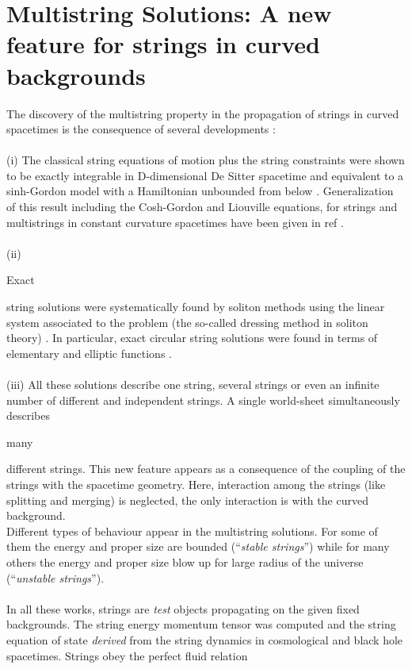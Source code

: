 \documentclass[12pt,a4paper]{article}
\begin{document}
\section{Multistring Solutions: A new feature for strings in curved 
backgrounds} 
The discovery of the multistring property \cite{cvms} \cite{vms} in the 
propagation of strings
in curved spacetimes is the consequence of several developments : \\ \\
(i) The classical string equations of motion plus the string constraints were
shown to be exactly integrable in D-dimensional De Sitter spacetime and 
equivalent to a sinh-Gordon model with a Hamiltonian unbounded from below \cite{vs2}.
 Generalization of this result including the Cosh-Gordon and Liouville 
equations, for strings and multistrings in constant curvature spacetimes have 
been given in ref \cite{ls5}.\\ \\
(ii) \begin{em}
Exact 
\end{em}
string solutions were systematically found by soliton methods using the linear system associated to the problem (the so-called dressing method in soliton
theory) \cite{cvms}. In particular, exact circular string solutions were found in 
terms of elementary \cite{vms} and elliptic functions \cite{vls1}.\\ \\
(iii) All these solutions describe one string, several strings or even an
infinite number of different and independent strings. A single world-sheet
simultaneously describes 
\begin{em}
many
\end{em}
different strings. This new feature appears as a consequence of the coupling
of the strings with the spacetime geometry. Here, interaction among the 
strings (like splitting and merging) is neglected, the only interaction is
with the curved background. \\
Different types of behaviour appear in the multistring solutions. For some of 
them the energy and proper size are bounded (``{\it stable strings}'') while 
for
many others the energy and proper size blow up for large radius of the 
universe (``{\it unstable strings}''). \\ \\
In all these works, strings are {\it test} objects propagating on the given
fixed backgrounds. The string energy momentum tensor was computed and the 
string equation of state {\it derived} from the string dynamics in cosmological and black hole spacetimes. Strings obey the perfect fluid relation 
\end{document}
